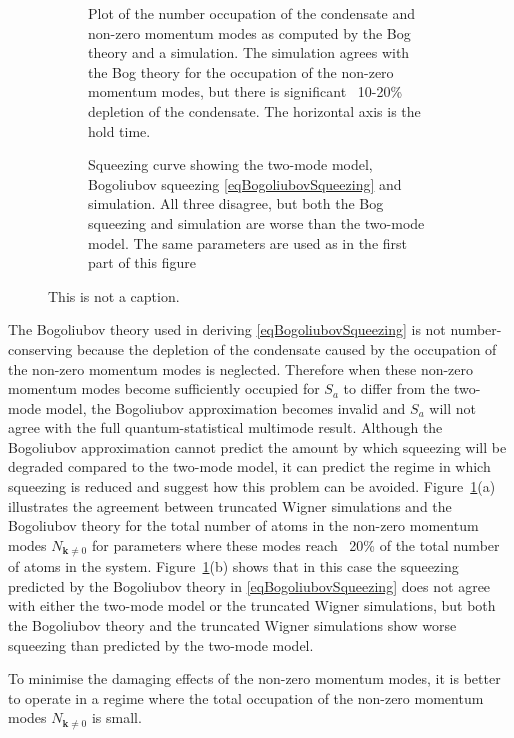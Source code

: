 \documentclass{iopart}
\begin{document}
\begin{figure}
  \centering
  \begin{subfigure}{.45\textwidth}
    \centering
    Plot of the number occupation of the condensate and non-zero momentum modes as computed by the Bog theory and a simulation.  The simulation agrees with the Bog theory for the occupation of the non-zero momentum modes, but there is significant ~10-20\% depletion of the condensate.  The horizontal axis is the hold time.
  \end{subfigure}
  \begin{subfigure}{.45\textwidth}
    \centering
Squeezing curve showing the two-mode model, Bogoliubov squeezing \eqref{eqBogoliubovSqueezing} and simulation.  All three disagree, but both the Bog squeezing and simulation are worse than the two-mode model.  The same parameters are used as in the first part of this figure
  \end{subfigure}%
\caption{This is not a caption.}
  \label{figBogSqueezingValidation}
\end{figure}


The Bogoliubov theory used in deriving \eqref{eqBogoliubovSqueezing} is not number-conserving because the depletion of the condensate caused by the occupation of the non-zero momentum modes is neglected.  Therefore when these non-zero momentum modes become sufficiently occupied for $S_a$ to differ from the two-mode model, the Bogoliubov approximation becomes invalid and $S_a$ will not agree with the full quantum-statistical multimode result.  Although the Bogoliubov approximation cannot predict the amount by which squeezing will be degraded compared to the two-mode model, it can predict the regime in which squeezing is reduced and suggest how this problem can be avoided.  Figure~\ref{figBogSqueezingValidation}(a) illustrates the agreement between truncated Wigner simulations and the Bogoliubov theory for the total number of atoms in the non-zero momentum modes $N_{\mathbf{k}\neq 0}$ for parameters where these modes reach ~20\% of the total number of atoms in the system.  Figure~\ref{figBogSqueezingValidation}(b) shows that in this case the squeezing predicted by the Bogoliubov theory in \eqref{eqBogoliubovSqueezing} does not agree with either the two-mode model or the truncated Wigner simulations, but both the Bogoliubov theory and the truncated Wigner simulations show worse squeezing than predicted by the two-mode model.

To minimise the damaging effects of the non-zero momentum modes, it is better to operate in a regime where the total occupation of the non-zero momentum modes $N_{\mathbf{k}\neq 0}$ is small.  
\end{document}
